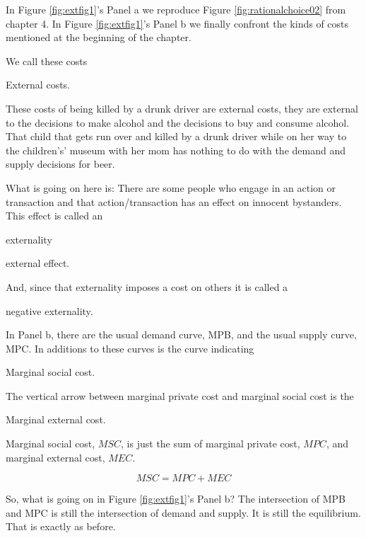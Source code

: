 \documentclass[
]{book}
\begin{document}
In Figure \ref{fig:extfig1}'s Panel a we reproduce Figure \ref{fig:rationalchoice02} from chapter 4. In Figure \ref{fig:extfig1}'s Panel b we finally confront the kinds of costs mentioned at the beginning of the chapter.

We call these costs

\begin{center}
External costs.

\end{center}

These costs of being killed by a drunk driver are external costs, they are external to the decisions to make alcohol and the decisions to buy and consume alcohol. That child that gets run over and killed by a drunk driver while on her way to the children's' museum with her mom has nothing to do with the demand and supply decisions for beer.

What is going on here is: There are some people who engage in an action or transaction and that action/transaction has an effect on innocent bystanders. This effect is called an

\begin{center}
externality

external effect.

\end{center}

And, since that externality imposes a cost on others it is called a

\begin{center}
negative externality.

\end{center}

In Panel b, there are the usual demand curve, MPB, and the usual supply curve, MPC. In additions to these curves is the curve indicating

\begin{center}
Marginal social cost.

The vertical arrow between marginal private cost and marginal social cost is the

Marginal external cost.

\end{center}

Marginal social cost, \(MSC\), is just the sum of marginal private cost, \(MPC\), and marginal external cost, \(MEC\).

\[MSC =  MPC + MEC\]

So, what is going on in Figure \ref{fig:extfig1}'s Panel b? The intersection of MPB and MPC is still the intersection of demand and supply. It is still the equilibrium. That is exactly as before.
\end{document}
